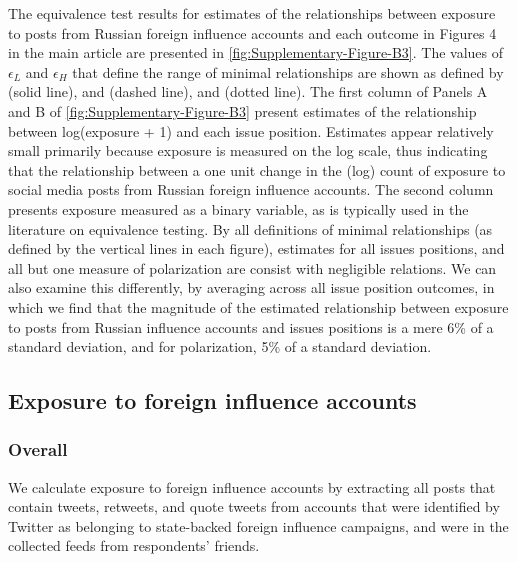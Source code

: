 \documentclass[
  12pt,
]{article}
\begin{document}
The equivalence test results for estimates of the relationships between exposure to posts from Russian foreign influence accounts and each outcome in Figures 4 in the main article are presented in \autoref{fig:Supplementary-Figure-B3}. The values of \(\epsilon_L\) and \(\epsilon_H\) that define the range of minimal relationships are shown as defined by \citet{Hartman2018} (solid line), \citet{Ho2007} and \citet{Imbens2015} (dashed line), and \citet{Cohen1969} (dotted line). The first column of Panels A and B of \autoref{fig:Supplementary-Figure-B3} present estimates of the relationship between log(exposure + 1) and each issue position. Estimates appear relatively small primarily because exposure is measured on the log scale, thus indicating that the relationship between a one unit change in the (log) count of exposure to social media posts from Russian foreign influence accounts. The second column presents exposure measured as a binary variable, as is typically used in the literature on equivalence testing. By all definitions of minimal relationships (as defined by the vertical lines in each figure), estimates for all issues positions, and all but one measure of polarization are consist with negligible relations. We can also examine this differently, by averaging across all issue position outcomes, in which we find that the magnitude of the estimated relationship between exposure to posts from Russian influence accounts and issues positions is a mere 6\% of a standard deviation, and for polarization, 5\% of a standard deviation.

\clearpage

\hypertarget{exposure-to-foreign-influence-accounts}{%
\subsection{Exposure to foreign influence accounts}\label{exposure-to-foreign-influence-accounts}}

\hypertarget{overall}{%
\subsubsection{\texorpdfstring{Overall\label{section:exposure}}{Overall}}\label{overall}}

We calculate exposure to foreign influence accounts by extracting all posts that contain tweets, retweets, and quote tweets from accounts that were identified by Twitter as belonging to state-backed foreign influence campaigns, and were in the collected feeds from respondents' friends.
\end{document}

